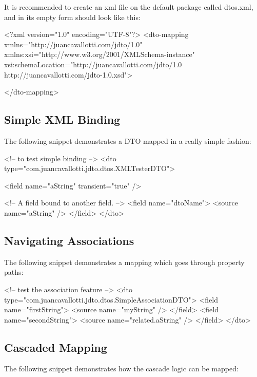 \documentclass[11pt]{article}
\begin{document}
It is recommended to create an xml file on the default package called dtos.xml, and in its empty form should look like this:

\begin{xml}
<?xml version="1.0" encoding="UTF-8"?>
<dto-mapping 
    xmlns="http://juancavallotti.com/jdto/1.0" 
    xmlns:xsi="http://www.w3.org/2001/XMLSchema-instance"
    xsi:schemaLocation="http://juancavallotti.com/jdto/1.0 
                        http://juancavallotti.com/jdto-1.0.xsd">
        
</dto-mapping>
\end{xml}


\subsection{Simple XML Binding}

The following snippet demonstrates a DTO mapped in a really simple fashion:

\begin{xml}
<!-- to test simple binding -->
<dto type="com.juancavallotti.jdto.dtos.XMLTesterDTO">

    <field name="aString" transient="true" />

    <!-- A field bound to another field. -->
    <field name="dtoName">
        <source name="aString" />
    </field>
</dto>
\end{xml}

\subsection{Navigating Associations}

The following snippet demonstrates a mapping which goes through property paths:

\begin{xml}
<!-- test the association feature -->
<dto type="com.juancavallotti.jdto.dtos.SimpleAssociationDTO">
    <field name="firstString">
        <source name="myString" />
    </field>
    <field name="secondString">
        <source name="related.aString" />
    </field>
</dto>
\end{xml}

\subsection{Cascaded Mapping}

The following snippet demonstrates how the cascade logic can be mapped:
\end{document}
